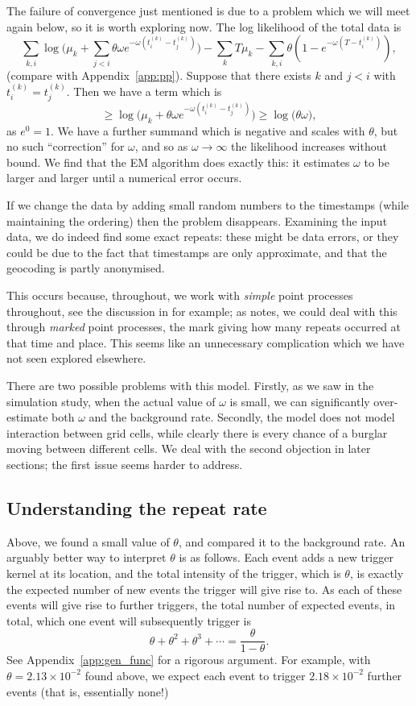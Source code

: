 \documentclass[twoside,a4paper]{article}
\theoremstyle{plain}
\theoremstyle{definition}
\begin{document}
The failure of convergence just mentioned is due to a problem which we will meet again below,
so it is worth exploring now.  The log likelihood of the total data is
\[ \sum_{k,i} \log\Big( \mu_k + \sum_{j<i} \theta\omega e^{-\omega(t^{(k)}_i - t^{(k)}_j)} \Big)
- \sum_k T\mu_k - \sum_{k,i} \theta(1-e^{-\omega(T-t^{(k)}_i)}), \]
(compare with Appendix~\ref{app:pp}).  Suppose that there exists $k$ and $j<i$ with
$t^{(k)}_i = t^{(k)}_j$.  Then we have a term which is
\[ \geq \log\Big( \mu_k + \theta \omega e^{-\omega(t^{(k)}_i - t^{(k)}_j)} \Big)
\geq \log( \theta\omega \big), \]
as $e^0 = 1$.  We have a further summand which is negative and scales with $\theta$, 
but no such ``correction'' for $\omega$, and so as $\omega\rightarrow\infty$ the
likelihood increases without bound.  We find that the EM algorithm does exactly this:
it estimates $\omega$ to be larger and larger until a numerical error occurs.

If we change the data by adding small random numbers to the timestamps (while maintaining
the ordering) then the problem disappears.  Examining the input data, we do indeed find
some exact repeats: these might be data errors, or they could be due to the fact that
timestamps are only approximate, and that the geocoding is partly anonymised.

This occurs because, throughout, we work with \emph{simple} point processes throughout,
see the discussion in \cite[Section~8.2.7]{cressie} for example; as \cite{cressie}
notes, we could deal with this through \emph{marked} point processes, the mark giving how
many repeats occurred at that time and place.  This seems like an unnecessary complication
which we have not seen explored elsewhere.

There are two possible problems with this model.  Firstly, as we saw in the simulation study,
when the actual value of $\omega$ is small, we can significantly over-estimate both
$\omega$ and the background rate.  Secondly, the model does not model interaction between
grid cells, while clearly there is every chance of a burglar moving between different cells.
We deal with the second objection in later sections; the first issue seems harder to address.


\subsection{Understanding the repeat rate}

Above, we found a small value of $\theta$, and compared it to the background rate.
An arguably better way to interpret $\theta$ is as follows.  Each event adds a new trigger
kernel at its location, and the total intensity of the trigger, which is $\theta$, is exactly
the expected number of new events the trigger will give rise to.  As each of these events
will give rise to further triggers, the total number of expected events, in total, which one
event will subsequently trigger is
\[ \theta + \theta^2 + \theta^3 + \cdots = \frac{\theta}{1-\theta}. \]
See Appendix~\ref{app:gen_func} for a rigorous argument.  For example, with $\theta=2.13
\times 10^{-2}$ found above, we expect each event to trigger $2.18\times 10^{-2}$ further
events (that is, essentially none!)
\end{document}
